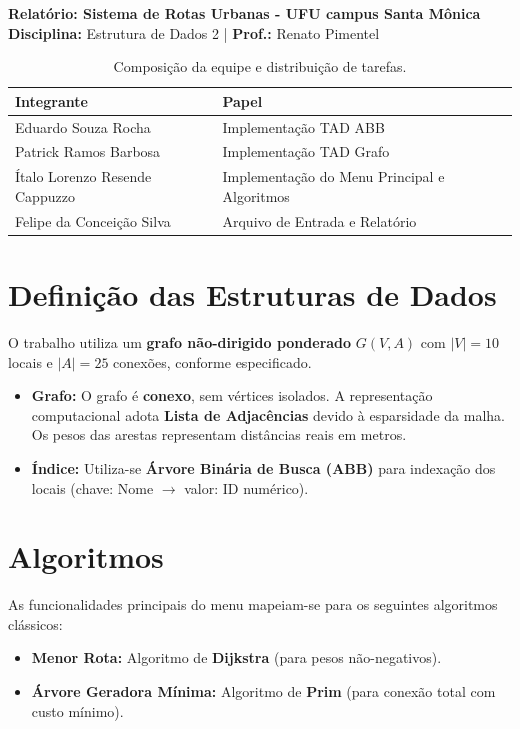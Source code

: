 \documentclass[a4paper,11pt]{article}
\begin{document}
\begin{center}
    {\large \textbf{Relatório: Sistema de Rotas Urbanas - UFU campus Santa Mônica}}\\
    \textbf{Disciplina:} Estrutura de Dados 2 \quad | \quad \textbf{Prof.:} Renato Pimentel
\end{center}

\begin{table}[h]
    \centering
    \small
    \caption{Composição da equipe e distribuição de tarefas.}
    \begin{tabular}{ll}
        \toprule
        \textbf{Integrante} & \textbf{Papel} \\
        \midrule
        Eduardo Souza Rocha & Implementação TAD ABB \\
        Patrick Ramos Barbosa & Implementação TAD Grafo  \\
        Ítalo Lorenzo Resende Cappuzzo & Implementação do Menu Principal e Algoritmos \\
        Felipe da Conceição Silva & Arquivo de Entrada e Relatório \\
        \bottomrule
    \end{tabular}
\end{table}

\section{Definição das Estruturas de Dados}
O trabalho utiliza um \textbf{grafo não-dirigido ponderado} $G(V, A)$ com $|V|=10$ locais e $|A|=25$ conexões, conforme especificado.
\begin{itemize}
    \item \textbf{Grafo:} O grafo é \textbf{conexo}, sem vértices isolados. A representação computacional adota \textbf{Lista de Adjacências} devido à esparsidade da malha. Os pesos das arestas representam distâncias reais em metros.
    \item \textbf{Índice:} Utiliza-se \textbf{Árvore Binária de Busca (ABB)} para indexação dos locais (chave: Nome $\to$ valor: ID numérico).
\end{itemize}

\section{Algoritmos}

As funcionalidades principais do menu mapeiam-se para os seguintes algoritmos clássicos:
\begin{itemize}
    \item \textbf{Menor Rota:} Algoritmo de \textbf{Dijkstra} (para pesos não-negativos).
    \item \textbf{Árvore Geradora Mínima:} Algoritmo de \textbf{Prim} (para conexão total com custo mínimo).
\end{itemize}
\end{document}
